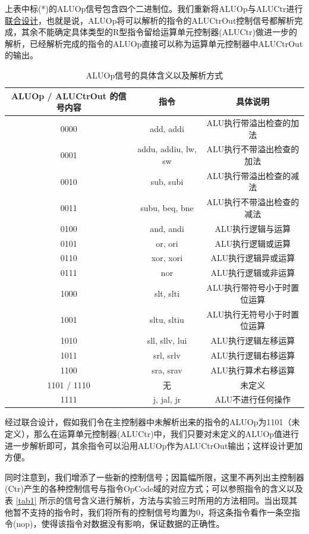 \documentclass{cumcm}
\numberwithin{equation}{section}
\numberwithin{equation}{subsection}
\begin{document}
上表中标(*)的ALUOp信号包含四个二进制位。我们重新将ALUOp与ALUCtr进行\underline{联合设计}，也就是说，ALUOp将可以解析的指令的ALUCtrOut控制信号都解析完成，其余不能确定具体类型的R型指令留给运算单元控制器(ALUCtr)做进一步的解析，已经解析完成的指令的ALUOp直接可以称为运算单元控制器中ALUCtrOut的输出。

\begin{table}[htbp]
    \centering
    \begin{tabular}{|c|c|c|}
         \hline
         ALUOp / ALUCtrOut 的信号内容 & 指令 & 具体说明 \\
         \hline
         0000 & add, addi & ALU执行带溢出检查的加法 \\
         0001 & addu, addiu, lw, sw & ALU执行不带溢出检查的加法 \\
         0010 & sub, subi & ALU执行带溢出检查的减法 \\
         0011 & subu, beq, bne & ALU执行不带溢出检查的减法 \\
         0100 & and, andi & ALU执行逻辑与运算 \\
         0101 & or, ori & ALU执行逻辑或运算 \\
         0110 & xor, xori & ALU执行逻辑异或运算 \\
         0111 & nor & ALU执行逻辑或非运算 \\
         1000 & slt, slti & ALU执行带符号小于时置位运算 \\
         1001 & sltu, sltiu & ALU执行无符号小于时置位运算 \\
         1010 & sll, sllv, lui & ALU执行逻辑左移运算 \\
         1011 & srl, srlv & ALU执行逻辑右移运算 \\
         1100 & sra, srav & ALU执行算术右移运算 \\
         1101 / 1110 & 无 & 未定义 \\
         1111 & j, jal, jr & ALU不进行任何操作 \\
         \hline
    \end{tabular}
    \caption{ALUOp信号的具体含义以及解析方式}
    \label{tab2}
\end{table}

经过联合设计，假如我们令在主控制器中未解析出来的指令的ALUOp为1101（未定义），那么在运算单元控制器(ALUCtr)中，我们只要对未定义的ALUOp值进行进一步解析即可，其余指令可以沿用ALUOp作为ALUCtrOut输出；这样设计更加方便。

同时注意到，我们增添了一些新的控制信号；因篇幅所限，这里不再列出主控制器(Ctr)产生的各种控制信号与指令OpCode域的对应方式；可以参照指令的含义以及表 \ref{tab1} 所示的信号含义进行解析，方法与实验三时所用的方法相同。当出现其他暂不支持的指令时，我们将所有的控制信号均置为0，将这条指令看作一条空指令(nop)，使得该指令对数据没有影响，保证数据的正确性。
\end{document}
